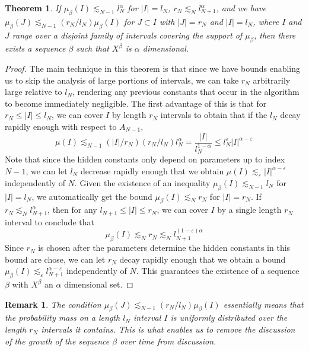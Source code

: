 \documentclass{report}
\theoremstyle{plain}
\theoremstyle{plain}
\newtheorem{theorem}{Theorem}
\newtheorem*{remark}{Remark}
\begin{document}
\begin{theorem}
    If $\mu_\beta(I) \lesssim_{N-1} l_N^\alpha$ for $|I| = l_N$, $r_N \lesssim_N l_{N+1}^\alpha$, and we have $\mu_\beta(J) \lesssim_{N-1} (r_N/l_N) \mu_\beta(I)$ for $J \subset I$ with $|J| = r_N$ and $|I| = l_N$, where $I$ and $J$ range over a disjoint family of intervals covering the support of $\mu_\beta$, then there exists a sequence $\beta$ such that $X^\beta$ is $\alpha$ dimensional.
\end{theorem}
\begin{proof}
    The main technique in this theorem is that since we have bounds enabling us to skip the analysis of large portions of intervals, we can take $r_N$ arbitrarily large relative to $l_N$, rendering any previous constants that occur in the algorithm to become immediately negligible. The first advantage of this is that for $r_N \leq |I| \leq l_N$, we can cover $I$ by length $r_N$ intervals to obtain that if the $l_N$ decay rapidly enough with respect to $A_{N-1}$,
%
\[ \mu(I) \lesssim_{N-1} (|I|/r_N) (r_N/l_N) l_N^\alpha = \frac{|I|}{l_N^{1 - \alpha}} \leq l_N^\varepsilon |I|^{\alpha - \varepsilon} \]
%
Note that since the hidden constants only depend on parameters up to index $N-1$, we can let $l_N$ decrease rapidly enough that we obtain $\mu(I) \lesssim_\varepsilon |I|^{\alpha - \varepsilon}$ independently of $N$. Given the existence of an inequality $\mu_\beta(I) \lesssim_{N-1} l_N$ for $|I| = l_N$, we automatically get the bound $\mu_\beta(I) \lesssim_N r_N$ for $|I| = r_N$. If $r_N \lesssim_N l_{N+1}^\alpha$, then for any $l_{N+1} \leq |I| \leq r_N$, we can cover $I$ by a single length $r_N$ interval to conclude that
%
\[ \mu_\beta(I) \lesssim_N r_N \lesssim_N l_{N+1}^{(1 - \varepsilon) \alpha} \]
%
Since $r_N$ is chosen after the parameters determine the hidden constants in this bound are chose, we can let $r_N$ decay rapidly enough that we obtain a bound $\mu_\beta(I) \lesssim_\varepsilon l_{N+1}^{\alpha - \varepsilon}$ independently of $N$. This guarantees the existence of a sequence $\beta$ with $X^\beta$ an $\alpha$ dimensional set.
\end{proof}

\begin{remark}
    The condition $\mu_\beta(J) \lesssim_{N-1} (r_N/l_N) \mu_\beta(I)$ essentially means that the probability mass on a length $l_N$ interval $I$ is uniformly distributed over the length $r_N$ intervals it contains. This is what enables us to remove the discussion of the growth of the sequence $\beta$ over time from discussion.
\end{remark}
\end{document}
